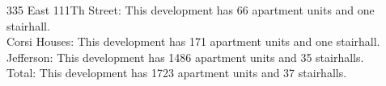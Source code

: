 {335 East 111Th Street}: This development has 66 apartment units and one stairhall.\\{Corsi Houses}: This development has 171 apartment units and one stairhall.\\{Jefferson}: This development has 1486 apartment units and 35 stairhalls.\\{Total}: This development has 1723 apartment units and 37 stairhalls.\\